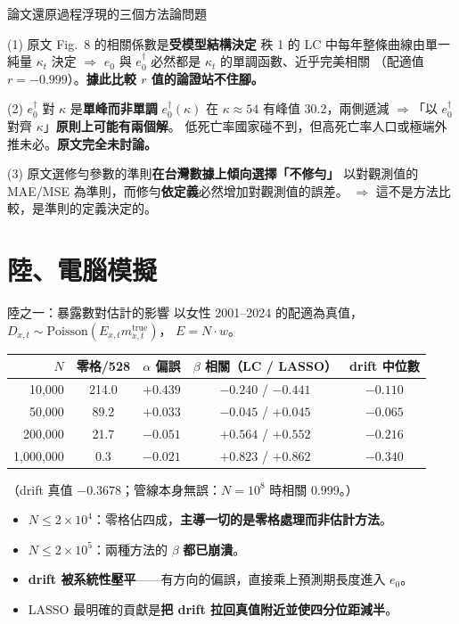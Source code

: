 \documentclass[aspectratio=169, UTF8, fontset=macnew, 11pt]{ctexbeamer}
\newcommand{\edag}{e_0^{\dagger}}
\newcommand{\hi}[1]{\textcolor{red!70!black}{\textbf{#1}}}
\newcommand{\gd}[1]{\textcolor{green!45!black}{\textbf{#1}}}
\begin{document}
\begin{frame}{論文還原過程浮現的三個方法論問題}
\begin{block}{(1) 原文 Fig.~8 的相關係數是\hi{受模型結構決定}}
\small 秩 1 的 LC 中每年整條曲線由單一純量 $\kappa_t$ 決定
$\Rightarrow$ $e_0$ 與 $\edag$ 必然都是 $\kappa_t$ 的單調函數、近乎完美相關
（配適值 $r=-0.999$）。\textbf{據此比較 $r$ 值的論證站不住腳。}
\end{block}
\begin{block}{(2) $\edag$ 對 $\kappa$ 是\hi{單峰而非單調}}
\small $\edag(\kappa)$ 在 $\kappa\approx54$ 有峰值 30.2，兩側遞減
$\Rightarrow$「以 $\edag$ 對齊 $\kappa$」\textbf{原則上可能有兩個解}。
低死亡率國家碰不到，但高死亡率人口或極端外推未必。\textbf{原文完全未討論。}
\end{block}
\begin{block}{(3) 原文選修勻參數的準則\hi{在台灣數據上傾向選擇「不修勻」}}
\small 以對觀測值的 MAE/MSE 為準則，而修勻\textbf{依定義}必然增加對觀測值的誤差。
$\Rightarrow$ 這不是方法比較，是準則的定義決定的。
\end{block}
\end{frame}

\section{陸、電腦模擬}

\begin{frame}{陸之一：暴露數對估計的影響}
以女性 2001--2024 的配適為真值，$D_{x,t}\sim\text{Poisson}(E_{x,t}m^{\text{true}}_{x,t})$，
$E=N\cdot w$。
\vspace{4pt}
\begin{center}\small
\begin{tabular}{rcccc}
\toprule
$N$ & 零格/528 & $\alpha$ 偏誤 & $\beta$ 相關（LC / LASSO） & drift 中位數\\
\midrule
10,000 & 214.0 & \hi{$+0.439$} & $-0.240$ / $-0.441$ & $-0.110$\\
50,000 & 89.2 & $+0.033$ & $-0.045$ / $+0.045$ & $-0.065$\\
200,000 & 21.7 & $-0.051$ & $+0.564$ / $+0.552$ & $-0.216$\\
1,000,000 & 0.3 & $-0.021$ & $+0.823$ / $+0.862$ & $-0.340$\\
\bottomrule
\end{tabular}
\end{center}
\vspace{4pt}
\footnotesize（drift 真值 $-0.3678$；管線本身無誤：$N=10^8$ 時相關 0.999。）
\vspace{4pt}
\begin{itemize}\footnotesize
  \item $N\le2\times10^4$：零格佔四成，\hi{主導一切的是零格處理而非估計方法}。
  \item $N\le2\times10^5$：兩種方法的 $\beta$ \hi{都已崩潰}。
  \item \hi{drift 被系統性壓平}——有方向的偏誤，直接乘上預測期長度進入 $e_0$。
  \item LASSO 最明確的貢獻是\gd{把 drift 拉回真值附近並使四分位距減半}。
\end{itemize}
\end{frame}
\end{document}
